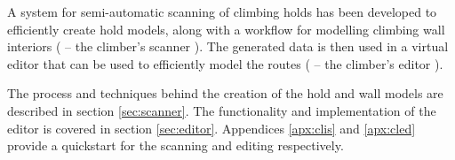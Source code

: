 A system for semi-automatic scanning of climbing holds has been developed to efficiently create hold models, along with a workflow for modelling climbing wall interiors (\raisebox{-0.08em}{} -- the climber's scanner \cite{clis}).
The generated data is then used in a virtual editor that can be used to efficiently model the routes (\raisebox{-0.08em}{} -- the climber's editor \cite{cled}).

The process and techniques behind the creation of the hold and wall models are described in section \ref{sec:scanner}.
The functionality and implementation of the editor is covered in section \ref{sec:editor}.
Appendices \ref{apx:clis} and \ref{apx:cled} provide a quickstart for the scanning and editing respectively.
